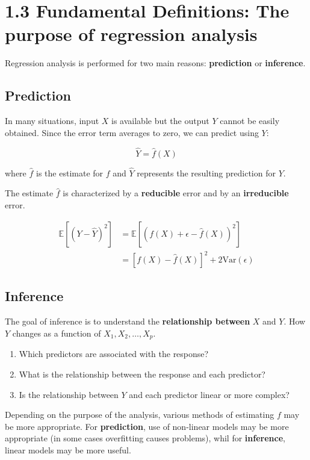 \documentclass[11pt]{article}
\begin{document}
\section{1.3 Fundamental Definitions: The purpose of regression analysis}

Regression analysis is performed for two main reasons: \textbf{prediction} or \textbf{inference}.

\subsection{Prediction}

In many situations, input \( X \) is available but the output \( Y \) cannot be easily obtained. Since the error term averages to zero, we can predict using \( Y \):

\begin{equation}
    \hat{Y} = \hat{f}(X)
\end{equation}

where \(\hat{f}\) is the estimate for \(f\) and \(\hat{Y}\) represents the resulting prediction for \(Y\).

The estimate \(\hat{f}\) is characterized by a \textbf{reducible} error and by an \textbf{irreducible} error.

\begin{align*}
    \mathbb{E}[(Y - \hat{Y})^2] &= \mathbb{E}[(f(X) + \epsilon - \hat{f}(X))^2] \\
    &= [f(X) - \hat{f}(X)]^2 + 2 \text{Var}(\epsilon)
\end{align*}

\subsection{Inference}

The goal of inference is to understand the \textbf{relationship between} \(X\) and \( Y \). How \( Y \) changes as a function of \( X_1, X_2, \ldots, X_p \).

\begin{enumerate}
    \item Which predictors are associated with the response?
    \item What is the relationship between the response and each predictor?
    \item Is the relationship between \( Y \) and each predictor linear or more complex?
\end{enumerate}

Depending on the purpose of the analysis, various methods of estimating $f$ may be more appropriate. For \textbf{prediction}, use of non-linear models may be more appropriate (in some cases overfitting causes problems), whil for \textbf{inference}, linear models may be more useful.
\end{document}
